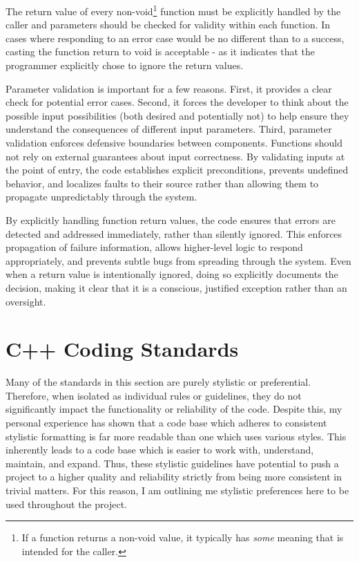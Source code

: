 The return value of every non-void\footnote{If a function returns a non-void value, it typically has \textit{some} meaning that is intended for the caller.} function must be explicitly handled by the caller and parameters should be checked for validity within each function. In cases where responding to an error case would be no different than to a success, casting the function return to void is acceptable - as it indicates that the programmer explicitly chose to ignore the return values.

Parameter validation is important for a few reasons. First, it provides a clear check for potential error cases. Second, it forces the developer to think about the possible input possibilities (both desired and potentially not) to help ensure they understand the consequences of different input parameters. Third, parameter validation enforces defensive boundaries between components. Functions should not rely on external guarantees about input correctness. By validating inputs at the point of entry, the code establishes explicit preconditions, prevents undefined behavior, and localizes faults to their source rather than allowing them to propagate unpredictably through the system. 

By explicitly handling function return values, the code ensures that errors are detected and addressed immediately, rather than silently ignored. This enforces propagation of failure information, allows higher-level logic to respond appropriately, and prevents subtle bugs from spreading through the system. Even when a return value is intentionally ignored, doing so explicitly documents the decision, making it clear that it is a conscious, justified exception rather than an oversight.











\section{C++ Coding Standards}

Many of the standards in this section are purely stylistic or preferential. Therefore, when isolated as individual rules or guidelines, they do not significantly impact the functionality or reliability of the code. Despite this, my personal experience has shown that a code base which adheres to consistent stylistic formatting is far more readable than one which uses various styles. This inherently leads to a code base which is easier to work with, understand, maintain, and expand. Thus, these stylistic guidelines have potential to push a project to a higher quality and reliability strictly from being more consistent in trivial matters. For this reason, I am outlining me stylistic preferences here to be used throughout the  project. 


